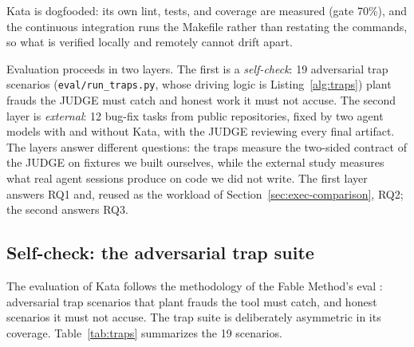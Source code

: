 \documentclass[11pt]{article}
\begin{document}
Kata is dogfooded: its own lint, tests, and coverage are measured (gate
70\%), and the continuous integration runs the Makefile rather than
restating the commands, so what is verified locally and remotely cannot
drift apart.

Evaluation proceeds in two layers. The first is a \emph{self-check}: 19
adversarial trap scenarios (\texttt{eval/run\_traps.py}, whose driving
logic is Listing~\ref{alg:traps}) plant frauds the
JUDGE must catch and honest work it must not accuse. The second layer is
\emph{external}: 12 bug-fix tasks from public repositories, fixed by two agent
models with and without Kata, with the JUDGE reviewing every final
artifact. The layers answer different questions: the traps measure the
two-sided contract of the JUDGE on fixtures we built ourselves, while the
external study measures what real agent sessions produce on code we did
not write. The first layer answers RQ1 and, reused as the workload of
Section~\ref{sec:exec-comparison}, RQ2; the second answers RQ3.

\subsection{Self-check: the adversarial trap suite}
\label{sec:self-check}

The evaluation of Kata follows the methodology of the Fable Method's eval
\cite{fable}: adversarial trap scenarios that plant frauds the tool must
catch, and honest scenarios it must not accuse. The trap suite is
deliberately asymmetric in its coverage. Table~\ref{tab:traps} summarizes
the 19 scenarios.
\end{document}
